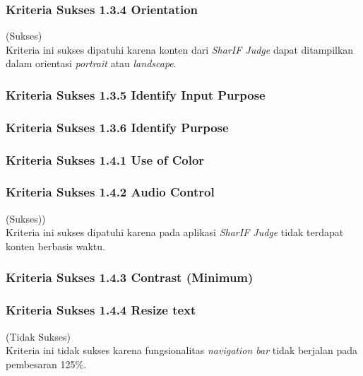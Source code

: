 \subsubsection{Kriteria Sukses 1.3.4 Orientation}
\label{subsubsec:kepatuhan_kriteria_1.3.4}
(Sukses) \\

Kriteria ini sukses dipatuhi karena konten dari \textit{SharIF Judge} dapat ditampilkan dalam orientasi \textit{portrait} atau \textit{landscape}.

\subsubsection{Kriteria Sukses 1.3.5 Identify Input Purpose}
\label{subsubsec:kepatuhan_kriteria_1.3.5}


\subsubsection{Kriteria Sukses 1.3.6 Identify Purpose}
\label{subsubsec:kepatuhan_kriteria_1.3.6}


\subsubsection{Kriteria Sukses 1.4.1 Use of Color}
\label{subsubsec:kepatuhan_kriteria_1.4.1}


\subsubsection{Kriteria Sukses 1.4.2 Audio Control}
\label{subsubsec:kepatuhan_kriteria_1.4.2}
(Sukses)) \\

Kriteria ini sukses dipatuhi karena pada aplikasi \textit{SharIF Judge} tidak terdapat konten berbasis waktu.

\subsubsection{Kriteria Sukses 1.4.3 Contrast (Minimum)}
\label{subsubsec:kepatuhan_kriteria_1.4.3}


\subsubsection{Kriteria Sukses 1.4.4 Resize text}
\label{subsubsec:kepatuhan_kriteria_1.4.4}
(Tidak Sukses) \\

Kriteria ini tidak sukses karena fungsionalitas \textit{navigation bar} tidak berjalan pada pembesaran 125\%.

